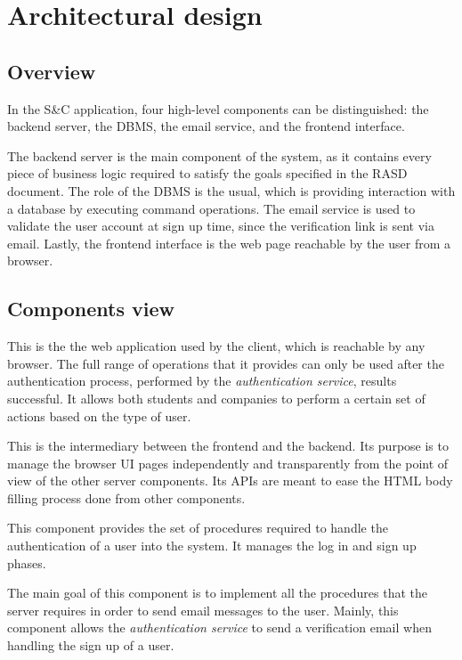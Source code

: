 \chapter{Architectural design}

\section{Overview}

In the S\&C application, four high-level components can be distinguished: the backend server, the DBMS, the email service, and the frontend interface.

The backend server is the main component of the system, as it contains every piece of business logic required to satisfy the goals specified in the RASD document.
The role of the DBMS is the usual, which is providing interaction with a database by executing command operations.
The email service is used to validate the user account at sign up time, since the verification link is sent via email.  
Lastly, the frontend interface is the web page reachable by the user from a browser.

\section{Components view}

This is the the web application used by the client, which is reachable by any browser.
The full range of operations that it provides can only be used after the authentication process, performed by the \textit{authentication service}, results successful.
It allows both students and companies to perform a certain set of actions based on the type of user.

This is the intermediary between the frontend and the backend.
Its purpose is to manage the browser UI pages independently and transparently from the point of view of the other server components.
Its APIs are meant to ease the HTML body filling process done from other components.

This component provides the set of procedures required to handle the authentication of a user into the system.
It manages the log in and sign up phases.

The main goal of this component is to implement all the procedures that the server requires in order to send email messages to the user.
Mainly, this component allows the \textit{authentication service} to send a verification email when handling the sign up of a user.  

